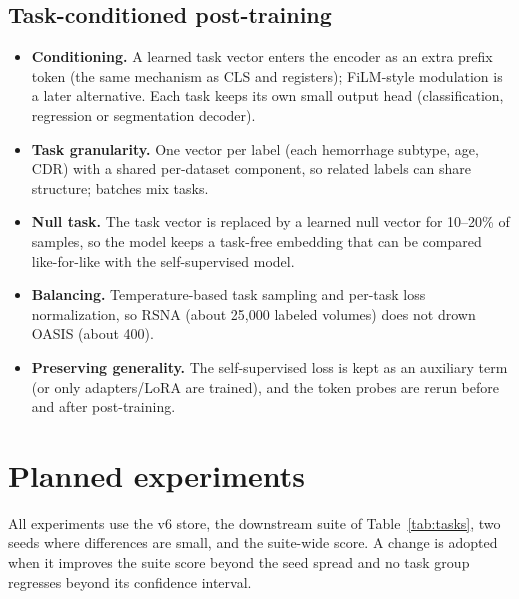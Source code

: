 \documentclass[10pt]{article}
\begin{document}
\subsection{Task-conditioned post-training}

\begin{itemize}
  \item \textbf{Conditioning.} A learned task vector enters the encoder as an extra prefix token (the same mechanism as
  CLS and registers); FiLM-style modulation is a later alternative. Each task keeps its own small output head
  (classification, regression or segmentation decoder).
  \item \textbf{Task granularity.} One vector per label (each hemorrhage subtype, age, CDR) with a shared
  per-dataset component, so related labels can share structure; batches mix tasks.
  \item \textbf{Null task.} The task vector is replaced by a learned null vector for 10--20\% of samples, so the model
  keeps a task-free embedding that can be compared like-for-like with the self-supervised model.
  \item \textbf{Balancing.} Temperature-based task sampling and per-task loss normalization, so RSNA (about 25{,}000
  labeled volumes) does not drown OASIS (about 400).
  \item \textbf{Preserving generality.} The self-supervised loss is kept as an auxiliary term (or only adapters/LoRA
  are trained), and the token probes are rerun before and after post-training.
\end{itemize}

\section{Planned experiments}

All experiments use the v6 store, the downstream suite of Table~\ref{tab:tasks}, two seeds where differences are
small, and the suite-wide score. A change is adopted when it improves the suite score beyond the seed spread and no
task group regresses beyond its confidence interval.
\end{document}
